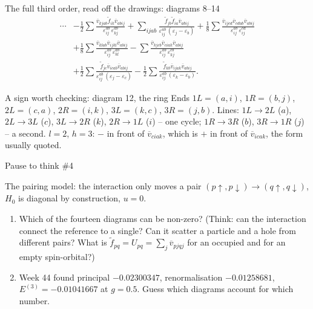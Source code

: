 \documentclass[aspectratio=169,10pt]{beamer}
\newcounter{thinkctr}
\newcommand{\thinkq}[2]{%
  \stepcounter{thinkctr}%
  \vfill
  \begin{tcolorbox}[enhanced,colback=palewarm,colframe=warm,boxrule=1.2pt,arc=4pt,
    grow to left by=6mm,grow to right by=6mm,
    left=16pt,right=16pt,top=16pt,bottom=18pt,
    fonttitle=\bfseries\Large,fontupper=\Large,
    title={Pause to think \#\thethinkctr\hfill\mdseries\normalsize(about #1 min -- discuss with your neighbour)}]
  #2
  \end{tcolorbox}
  \vfill}
\newcommand{\vbar}[4]{\overline v_{#1#2#3#4}}
\newcommand{\ftil}[1]{\tilde f_{#1}}
\begin{document}
\begin{frame}[shrink=8]{The full third order, read off the drawings: diagrams 8--14}
\begin{align*}
\cdots
&- \frac12\sum\frac{\vbar{k}{j}{a}{b}\ftil{ik}\vbar{a}{b}{i}{j}}{\varepsilon_{ij}^{ab}\,\varepsilon_{kj}^{ab}}
 + \sum_{ijab}\frac{\ftil{jb}\ftil{ia}\vbar{a}{b}{i}{j}}{\varepsilon_{ij}^{ab}\,(\varepsilon_j-\varepsilon_b)}
 + \frac18\sum\frac{\vbar{i}{j}{c}{d}\vbar{c}{d}{a}{b}\vbar{a}{b}{i}{j}}{\varepsilon_{ij}^{ab}\,\varepsilon_{ij}^{cd}}\\
&+ \frac18\sum\frac{\vbar{k}{l}{a}{b}\vbar{i}{j}{k}{l}\vbar{a}{b}{i}{j}}{\varepsilon_{ij}^{ab}\,\varepsilon_{kl}^{ab}}
 - \sum\frac{\vbar{k}{j}{c}{b}\vbar{c}{i}{a}{k}\vbar{a}{b}{i}{j}}{\varepsilon_{ij}^{ab}\,\varepsilon_{kj}^{cb}}\\
&+ \frac12\sum\frac{\ftil{jc}\vbar{i}{c}{a}{b}\vbar{a}{b}{i}{j}}{\varepsilon_{ij}^{ab}\,(\varepsilon_j-\varepsilon_c)}
 - \frac12\sum\frac{\ftil{kb}\vbar{i}{j}{a}{k}\vbar{a}{b}{i}{j}}{\varepsilon_{ij}^{ab}\,(\varepsilon_k-\varepsilon_b)}.
\end{align*}
\begin{block}{A sign worth checking: diagram 12, the ring}
Ends \(1L{=}(a,i)\), \(1R{=}(b,j)\), \(2L{=}(c,a)\), \(2R{=}(i,k)\), \(3L{=}(k,c)\), \(3R{=}(j,b)\). Lines: \(1L\to2L\) (\(a\)), \(2L\to3L\) (\(c\)), \(3L\to2R\) (\(k\)), \(2R\to1L\) (\(i\)) -- one cycle; \(1R\to3R\) (\(b\)), \(3R\to1R\) (\(j\)) -- a second. \(l=2\), \(h=3\): \(-\) in front of \(\vbar{c}{i}{a}{k}\), which is \(+\) in front of \(\vbar{i}{c}{a}{k}\), the form usually quoted.
\end{block}
\end{frame}

\begin{frame}[shrink=1]{Pause to think \#4}
\thinkq{4}{The pairing model: the interaction only moves a pair \((p\!\uparrow,p\!\downarrow)\to(q\!\uparrow,q\!\downarrow)\), \(H_0\) is diagonal by construction, \(u=0\).
\begin{enumerate}
\item Which of the fourteen diagrams can be non-zero? (Think: can the interaction connect the reference to a single? Can it scatter a particle and a hole from different pairs? What is \(\ftil{pq}=U_{pq}=\sum_j\vbar{p}{j}{q}{j}\) for an occupied and for an empty spin-orbital?)
\item Week 44 found principal \(-0.02300347\), renormalisation \(-0.01258681\), \(E^{(3)}=-0.01041667\) at \(g=0.5\). Guess which diagrams account for which number.
\end{enumerate}}
\end{frame}
\end{document}
